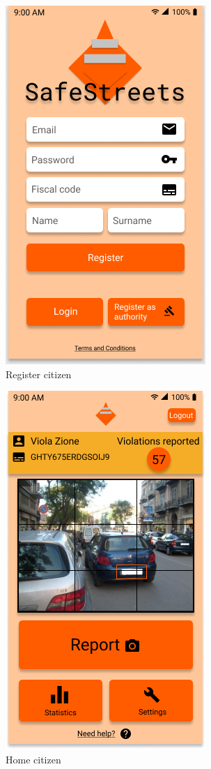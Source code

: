 \documentclass{article}
\begin{document}
\begin{figure}[h!]
    \centering
    \includegraphics[scale=0.5]{img/mockups/register_citizen.png}
    \caption{Register citizen}
\end{figure}

\begin{figure}[h!]
    \centering
    \includegraphics[scale=0.5]{img/mockups/home_citizen.png}
    \caption{Home citizen}
\end{figure}
\end{document}
